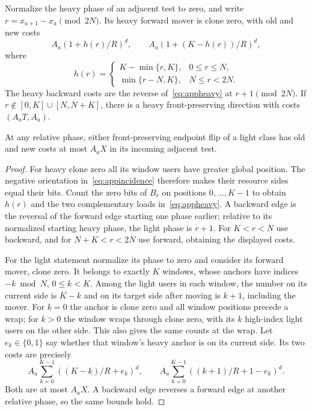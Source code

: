 \documentclass[manuscript,review,anonymous]{acmart}
\begin{document}
\begin{lemma}\label{lem:appendpoints}
Normalize the heavy phase of an adjacent test to zero, and write $r=x_{a+1}-x_a\pmod{2N}$. Its heavy forward mover is clone zero, with old and new costs
\begin{equation}\label{eq:appheavy}
 A_a(1+h(r)/R)^d,\qquad
 A_a(1+(K-h(r))/R)^d,
\end{equation}
where
\[
 h(r)=\begin{cases}
 K-\min\{r,K\},&0\le r\le N,\\
 \min\{r-N,K\},&N\le r<2N.
 \end{cases}
\]
The heavy backward costs are the reverse of~\eqref{eq:appheavy} at $r+1\pmod{2N}$. If $r\notin[0,K]\cup[N,N+K]$, there is a heavy front-preserving direction with costs $(A_aT,A_a)$.

At any relative phase, either front-preserving endpoint flip of a light class has old and new costs at most $A_aX$ in its incoming adjacent test.
\end{lemma}
\begin{proof}
For heavy clone zero all its window users have greater global position. The negative orientation in~\eqref{eq:appincidence} therefore makes their resource sides equal their bits. Count the zero bits of $B_r$ on positions $0,\ldots,K-1$ to obtain $h(r)$ and the two complementary loads in~\eqref{eq:appheavy}. A backward edge is the reversal of the forward edge starting one phase earlier; relative to its normalized starting heavy phase, the light phase is $r+1$. For $K<r<N$ use backward, and for $N+K<r<2N$ use forward, obtaining the displayed costs.

For the light statement normalize its phase to zero and consider its forward mover, clone zero. It belongs to exactly $K$ windows, whose anchors have indices $-k\bmod N$, $0\le k<K$. Among the light users in each window, the number on its current side is $K-k$ and on its target side after moving is $k+1$, including the mover. For $k=0$ the anchor is clone zero and all window positions precede a wrap; for $k>0$ the window wraps through clone zero, with its $k$ high-index light users on the other side. This also gives the same counts at the wrap. Let $e_k\in\{0,1\}$ say whether that window's heavy anchor is on its current side. Its two costs are precisely
\begin{equation}\label{eq:applight}
 A_a\sum_{k=0}^{K-1}((K-k)/R+e_k)^d,\qquad
 A_a\sum_{k=0}^{K-1}((k+1)/R+1-e_k)^d.
\end{equation}
Both are at most $A_aX$. A backward edge reverses a forward edge at another relative phase, so the same bounds hold.
\end{proof}
\end{document}
